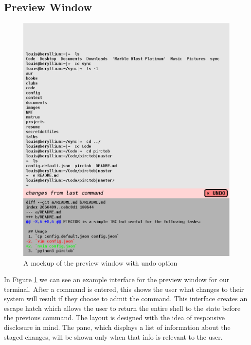 \subsection{Preview Window}

\begin{figure}[H]
  \centering
  \includegraphics[width=0.8\linewidth]{figures/interface/undo.eps}
  \caption{A mockup of the preview window with undo option}
  \label{fig:undo}
\end{figure}

In Figure \ref{fig:undo} we can see an example interface for the preview window
for our terminal. After a command is entered, this shows the user what changes
to their system will result if they choose to admit the command. This interface
creates an escape hatch which allows the user to return the entire shell to the
state before the previous command. The layout is designed with the idea of
responsive disclosure in mind. The pane, which displays a list of information
about the staged changes, will be shown only when that info is relevant to the
user.
